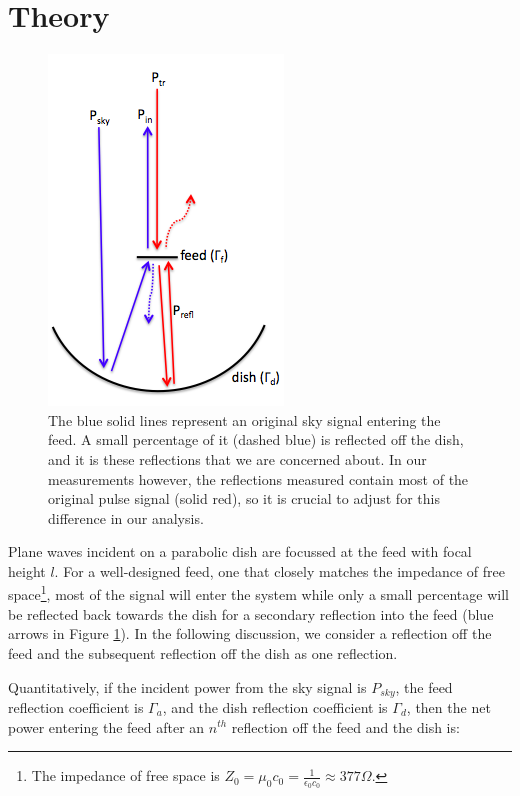 \documentclass[12pt,preprint]{aastex}
\begin{document}
\section{Theory}{\label{sec:theory}}
\begin{figure}[ht!]
\centering
\includegraphics[totalheight=0.3\textheight]{plots/reflection_cartoon.png}
\caption{The blue solid lines represent an original sky signal entering the
feed. A small percentage of it (dashed blue) is reflected off the dish, and it
is these reflections that we are concerned about. In our measurements however,
the reflections measured contain most of the original pulse signal (solid red),
so it is crucial to adjust for this difference in our analysis.}
\label{fig:cartoon}
\end{figure}
Plane waves incident on a parabolic dish
are focussed at the feed with focal height $l$. For a well-designed feed, one
that closely matches the impedance of free space\footnote{The impedance of free space
is $Z_{0} = \mu_{0}c_{0} = \frac{1}{\epsilon_{0}c_{0}} \approx 377\Omega $.},
most of the signal will enter the system while only
a small percentage will be reflected back towards the dish for a secondary
reflection into the feed (blue arrows in Figure \ref{fig:cartoon}). In the
following discussion, we consider a reflection off the feed and the
subsequent reflection off the dish as one reflection.

Quantitatively, if the incident power from the sky signal is $P_{sky}$, the feed
reflection coefficient is $\Gamma_{a}$, and the dish reflection
coefficient is $\Gamma_{d}$, then the net power entering the feed after an
$n^{th}$ reflection off the feed and the dish is:
\end{document}
